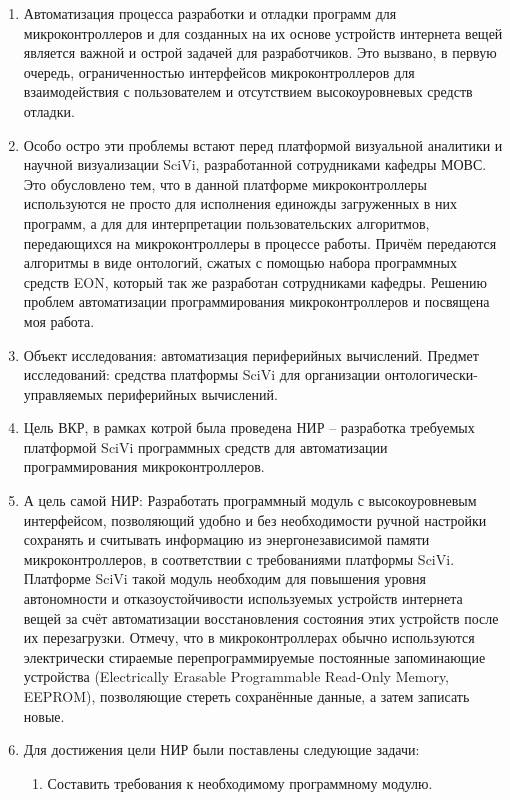 \documentclass[14pt]{extarticle}
\begin{document}
\begin{enumerate}
	\item Автоматизация процесса разработки и отладки программ для микроконтроллеров и для созданных на их основе устройств интернета вещей является важной и острой задачей для разработчиков.
	Это вызвано, в первую очередь, ограниченностью интерфейсов микроконтроллеров для взаимодействия с пользователем и отсутствием высокоуровневых средств отладки.
	\item Особо остро эти проблемы встают перед платформой визуальной аналитики и научной визуализации SciVi, разработанной сотрудниками кафедры МОВС. 
	Это обусловлено тем, что в данной платформе микроконтроллеры используются не просто для исполнения единожды загруженных в них программ, а для для интерпретации пользовательских алгоритмов, передающихся на микроконтроллеры в процессе работы.
	Причём передаются алгоритмы в виде онтологий, сжатых с помощью набора программных средств EON, который так же разработан сотрудниками кафедры.
	Решению проблем автоматизации программирования микроконтроллеров и посвящена моя работа.
	\item 
	Объект исследования:  автоматизация периферийных вычислений.
	Предмет исследований: средства платформы SciVi для организации онтологически-управляемых периферийных вычислений.
	\item Цель ВКР, в рамках котрой была проведена НИР -- разработка требуемых платформой SciVi программных средств для автоматизации программирования микроконтроллеров.
	\item А цель самой НИР: Разработать программный модуль с высокоуровневым интерфейсом, позволяющий удобно и без необходимости ручной настройки сохранять и считывать информацию из энергонезависимой памяти микроконтроллеров, в соответствии с требованиями платформы SciVi.
	Платформе SciVi такой модуль необходим для повышения уровня автономности и отказоустойчивости используемых устройств интернета вещей за счёт автоматизации восстановления состояния этих устройств после их перезагрузки.
	Отмечу, что в микроконтроллерах обычно используются электрически стираемые перепрограммируемые постоянные запоминающие устройства (Electrically Erasable Programmable Read-Only Memory, EEPROM), позволяющие стереть сохранённые данные, а затем записать новые.
	\item Для достижения цели НИР были поставлены следующие задачи:
	\begin{enumerate}
		\item Составить требования к необходимому программному модулю.

\end{enumerate}
\end{enumerate}
\end{document}
